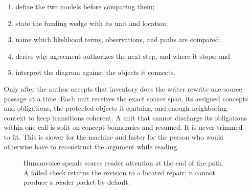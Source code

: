 \begin{enumerate}
\item define the two models before comparing them;
\item state the funding wedge with its unit and location;
\item name which likelihood terms, observations, and paths are compared;
\item derive why agreement authorizes the next step, and where it stops; and
\item interpret the diagram against the objects it connects.
\end{enumerate}

Only after the author accepts that inventory does the writer rewrite one source
passage at a time. Each unit receives the exact source span, its assigned
concepts and obligations, the protected objects it contains, and enough
neighboring context to keep transitions coherent. A unit that cannot discharge
its obligations within one call is split on concept boundaries and resumed. It is
never trimmed to fit. This is slower for the machine and faster for the person
who would otherwise have to reconstruct the argument while reading.

\begin{figure}[H]
\centering
{}
\caption{Humanvoice spends scarce reader attention at the end of the path. A
failed check returns the revision to a located repair; it cannot produce a
reader packet by default.}
\label{fig:pre-human-pipeline}
\end{figure}

